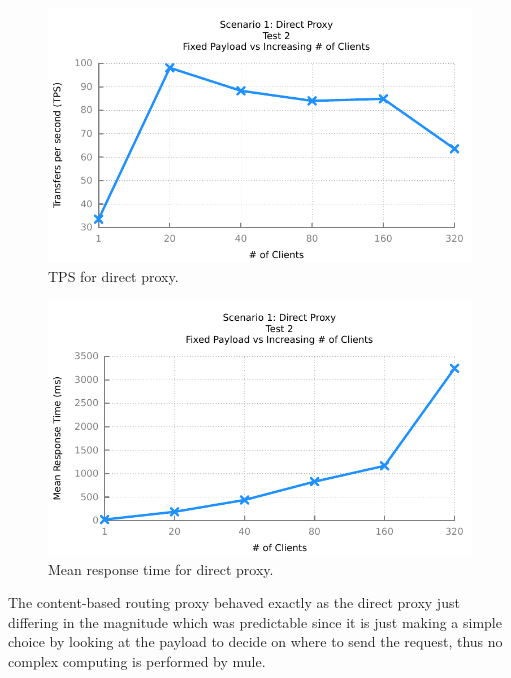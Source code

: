 \begin{figure}[H]
	\caption{TPS for direct proxy.}
	\centerline{\includegraphics{img/proxy_fp_iu_tps}}
	\label{fig:proxy-2-1}
\end{figure}

\begin{figure}[H]
	\caption{Mean response time for direct proxy.}
	\centerline{\includegraphics{img/proxy_fp_iu_resp}}
	\label{fig:proxy-2-2}
\end{figure}

The content-based routing proxy behaved exactly as the direct proxy just differing in the magnitude which was predictable since it is just making a simple choice by looking at the payload to decide on where to send the request, thus no complex computing is performed by mule.

